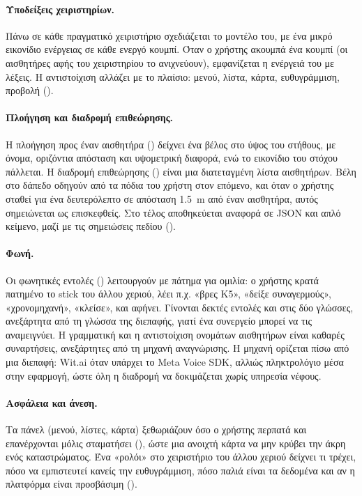 \paragraph{Υποδείξεις χειριστηρίων.} Πάνω σε κάθε πραγματικό χειριστήριο σχεδιάζεται το μοντέλο του, με ένα μικρό εικονίδιο ενέργειας σε κάθε ενεργό κουμπί. Όταν ο χρήστης ακουμπά ένα κουμπί (οι αισθητήρες αφής του χειριστηρίου το ανιχνεύουν), εμφανίζεται η ενέργειά του με λέξεις. Η αντιστοίχιση αλλάζει με το πλαίσιο: μενού, λίστα, κάρτα, ευθυγράμμιση, προβολή ().

\paragraph{Πλοήγηση και διαδρομή επιθεώρησης.} Η πλοήγηση προς έναν αισθητήρα () δείχνει ένα βέλος στο ύψος του στήθους, με όνομα, οριζόντια απόσταση και υψομετρική διαφορά, ενώ το εικονίδιο του στόχου πάλλεται. Η διαδρομή επιθεώρησης () είναι μια διατεταγμένη λίστα αισθητήρων. Βέλη στο δάπεδο οδηγούν από τα πόδια του χρήστη στον επόμενο, και όταν ο χρήστης σταθεί για ένα δευτερόλεπτο σε απόσταση \SI{1.5}{m} από έναν αισθητήρα, αυτός σημειώνεται ως επισκεφθείς. Στο τέλος αποθηκεύεται αναφορά σε JSON και απλό κείμενο, μαζί με τις σημειώσεις πεδίου ().

\paragraph{Φωνή.} Οι φωνητικές εντολές () λειτουργούν με πάτημα για ομιλία: ο χρήστης κρατά πατημένο το stick του άλλου χεριού, λέει π.χ. «βρες Κ5», «δείξε συναγερμούς», «χρονομηχανή», «κλείσε», και αφήνει. Γίνονται δεκτές εντολές και στις δύο γλώσσες, ανεξάρτητα από τη γλώσσα της διεπαφής, γιατί ένα συνεργείο μπορεί να τις αναμειγνύει. Η γραμματική και η αντιστοίχιση ονομάτων αισθητήρων είναι καθαρές συναρτήσεις, ανεξάρτητες από τη μηχανή αναγνώρισης. Η μηχανή ορίζεται πίσω από μια διεπαφή: Wit.ai όταν υπάρχει το Meta Voice SDK, αλλιώς πληκτρολόγιο μέσα στην εφαρμογή, ώστε όλη η διαδρομή να δοκιμάζεται χωρίς υπηρεσία νέφους.

\paragraph{Ασφάλεια και άνεση.} Τα πάνελ (μενού, λίστες, κάρτα) ξεθωριάζουν όσο ο χρήστης περπατά και επανέρχονται μόλις σταματήσει (), ώστε μια ανοιχτή κάρτα να μην κρύβει την άκρη ενός καταστρώματος. Ένα «ρολόι» στο χειριστήριο του άλλου χεριού δείχνει τι τρέχει, πόσο να εμπιστευτεί κανείς την ευθυγράμμιση, πόσο παλιά είναι τα δεδομένα και αν η πλατφόρμα είναι προσβάσιμη ().

